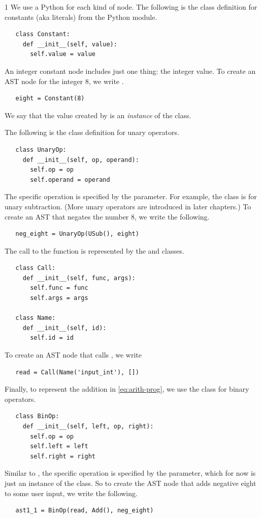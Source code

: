 \documentclass[7x10]{TimesAPriori_MIT}%
\def\pythonEd{1}
\providecommand{\BookEdition}{1}
\let\edition\BookEdition
\newcommand{\pythonColor}[0]{}
\numberwithin{theorem}{chapter}
\numberwithin{definition}{chapter}
\numberwithin{equation}{chapter}
\begin{document}
{\if\edition\pythonEd\pythonColor
We use a Python  for each kind of node.
The following is the class definition for
constants (aka literals)
from the Python  module.
\begin{lstlisting}
   class Constant:
     def __init__(self, value):
       self.value = value
\end{lstlisting}
An integer constant node includes just one thing: the integer value.
To create an AST node for the integer $8$, we write .
\begin{lstlisting}
   eight = Constant(8)
\end{lstlisting}
We say that the value created by  is an
\emph{instance} of the  class.

The following is the class definition for unary operators.
\begin{lstlisting}
   class UnaryOp:
     def __init__(self, op, operand):
       self.op = op
       self.operand = operand
\end{lstlisting}
The specific operation is specified by the  parameter.  For
example, the class  is for unary subtraction.
(More unary operators are introduced in later chapters.) To create an AST that
negates the number $8$, we write the following.
\begin{lstlisting}
   neg_eight = UnaryOp(USub(), eight)
\end{lstlisting}

The call to the  function is represented by the
 and  classes.
\begin{lstlisting}
   class Call:
     def __init__(self, func, args):
       self.func = func
       self.args = args

   class Name:
     def __init__(self, id):        
       self.id = id
\end{lstlisting}
To create an AST node that calls , we write
\begin{lstlisting}
   read = Call(Name('input_int'), [])
\end{lstlisting}

Finally, to represent the addition in \eqref{eq:arith-prog}, we use
the  class for binary operators.
\begin{lstlisting}
   class BinOp:
     def __init__(self, left, op, right):
       self.op = op
       self.left = left
       self.right = right
\end{lstlisting}
Similar to , the specific operation is specified by the
 parameter, which for now is just an instance of the
 class. So to create the AST
node that adds negative eight to some user input, we write the following.
\begin{lstlisting}
   ast1_1 = BinOp(read, Add(), neg_eight)
\end{lstlisting}
\fi}
\end{document}
